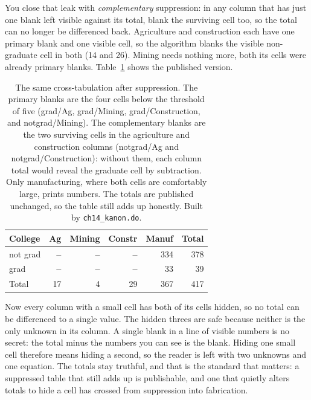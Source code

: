 \documentclass[
    a4paper,
    fontsize=10pt,
    twoside=true,
    numbers=noenddot,
]{kaobook}
\begin{document}
You close that leak with \emph{complementary} suppression: in any column that has just one blank left visible against its total, blank the surviving cell too, so the total can no longer be differenced back. Agriculture and construction each have one primary blank and one visible cell, so the algorithm blanks the visible non-graduate cell in both (14 and 26). Mining needs nothing more, both its cells were already primary blanks. Table~\ref{tab:suppress} shows the published version.

\begin{table}[htbp]
\centering
{\footnotesize
\begin{tabular}{lrrrrr}
\hline
College   & Ag & Mining & Constr & Manuf & Total \\
\hline
not grad  & \textbf{--} & \textbf{--} & \textbf{--} & 334 & 378 \\
grad      & \textbf{--} & \textbf{--} & \textbf{--} &  33 &  39 \\
\hline
Total     & 17 &  4 & 29 & 367 & 417 \\
\hline
\end{tabular}
}
\caption[Primary and complementary suppression]{The same cross-tabulation after suppression. The primary blanks are the four cells below the threshold of five (grad/Ag, grad/Mining, grad/Construction, and notgrad/Mining). The complementary blanks are the two surviving cells in the agriculture and construction columns (notgrad/Ag and notgrad/Construction): without them, each column total would reveal the graduate cell by subtraction. Only manufacturing, where both cells are comfortably large, prints numbers. The totals are published unchanged, so the table still adds up honestly. Built by \texttt{ch14\_kanon.do}.}
\label{tab:suppress}
\end{table}

Now every column with a small cell has both of its cells hidden, so no total can be differenced to a single value. The hidden threes are safe because neither is the only unknown in its column. A single blank in a line of visible numbers is no secret: the total minus the numbers you can see is the blank. Hiding one small cell therefore means hiding a second, so the reader is left with two unknowns and one equation. The totals stay truthful, and that is the standard that matters: a suppressed table that still adds up is publishable, and one that quietly alters totals to hide a cell has crossed from suppression into fabrication.
\end{document}
